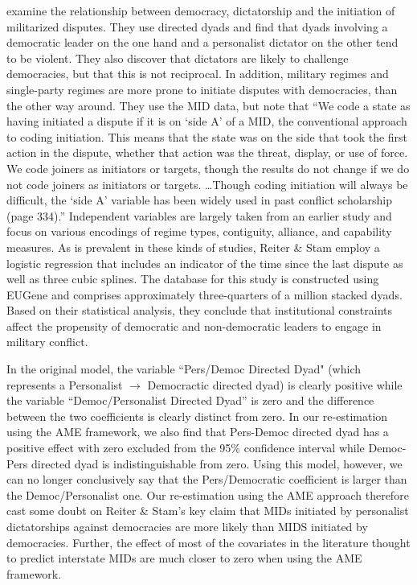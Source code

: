 \citet{reiter:stam:2003} examine the relationship between democracy, dictatorship and the initiation of militarized disputes.  They use directed dyads and find that dyads involving a democratic leader on the one hand and a personalist dictator on the other tend to be violent. They also discover that dictators are likely to challenge democracies, but that this is not reciprocal.  In addition, military regimes and single-party regimes are more prone to initiate disputes with democracies, than the other way around.  They use the MID data, but note that ``We code a state as having initiated a dispute if it is on `side A' of a MID, the conventional approach to coding initiation. This means that the state was on the side that took the first action in the dispute, whether that action was the threat, display, or use of force. We code joiners as initiators or targets, though the results do not change if we do not code joiners as initiators or targets. \ldots Though coding initiation will always be difficult, the `side A' variable has been widely used in past conflict scholarship (page 334).'' Independent variables are largely taken from an earlier study and focus on various encodings of regime types, contiguity, alliance, and capability measures. As is prevalent in these kinds of studies, Reiter \& Stam employ a logistic regression that includes an indicator of the time since the last dispute as well as three cubic splines. The database for this study is constructed using EUGene \citep{bennett:stam:2000} and comprises approximately three-quarters of a million stacked dyads. Based on their statistical analysis, they conclude that institutional constraints affect the propensity of democratic and non-democratic leaders to engage in military conflict. 

In the original model, the variable ``Pers/Democ Directed Dyad" (which represents a Personalist $\rightarrow$ Democractic directed dyad) is clearly positive while the variable ``Democ/Personalist Directed Dyad'' is zero and the difference between the two coefficients is clearly distinct from zero. In our re-estimation using the AME framework, we also find that Pers-Democ directed dyad has a positive effect with zero excluded from the 95\% confidence interval while Democ-Pers directed dyad is indistinguishable from zero. Using this model, however, we can no longer conclusively say that the Pers/Democratic coefficient is larger than the Democ/Personalist one. Our re-estimation using the AME approach therefore cast some doubt on Reiter \& Stam's key claim that MIDs initiated by personalist dictatorships against democracies are more likely than MIDS initiated by democracies. Further, the effect of most of the covariates in the literature thought to predict interstate MIDs are much closer to zero when using the AME framework. 

